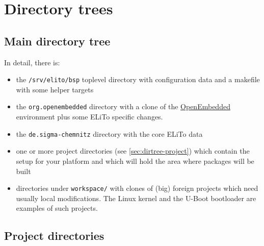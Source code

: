 \chapter{\label{app:dirtree}Directory trees}

\section{Main directory tree}
\label{sec:dirtree-main}

\vspace{1em}

In detail, there is:
\begin{itemize}
\item the \texttt{/srv/elito/bsp} toplevel directory with configuration
  data and a makefile with some helper targets
\item the \texttt{org.openembedded} directory with a clone of the
  \href{http://www.openembedded.org}{OpenEmbedded} environment plus
  some ELiTo specific changes.
\item the \texttt{de.sigma-chemnitz} directory with the core ELiTo
  data
\item one or more project directories (see
  \autoref{sec:dirtree-project}) which contain the setup for your
  platform and which will hold the area where packages will be built
\item directories under \texttt{workspace/} with clones of (big)
  foreign projects which need usually local modifications. The Linux
  kernel and the U-Boot bootloader are examples of such projects.
\end{itemize}

\section{Project directories}
\label{sec:dirtree-project}

